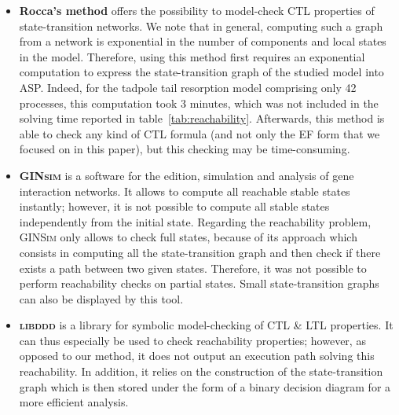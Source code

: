 
 

\begin{itemize}

\item \textbf{Rocca's method} offers the possibility to model-check CTL properties
of state-transition networks.
We note that in general, computing such a graph from a network is exponential in the number of components and local states in the model.
Therefore, using this method first requires an exponential computation to
express the state-transition graph of the studied model into ASP.
Indeed, for the tadpole tail resorption model comprising only 42 processes,
this computation took 3 minutes, which was not included in the solving time
reported in table~\ref{tab:reachability}.
Afterwards, this method is able to check any kind of CTL formula
(and not only the EF form that we focused on in this paper),
but this checking may be time-consuming.

\item \textbf{\textsc{GINsim}} is a software for the edition, simulation and analysis
of gene interaction networks.
It allows to compute all reachable stable states instantly;
however, it is not possible to compute all stable states independently from the initial state.
Regarding the reachability problem, \textsc{GINSim} only allows to check
full states, because of its approach which consists in computing
all the state-transition graph
 
and then check if there exists a path between two given states.
Therefore, it was not possible to perform reachability checks on partial states.
Small state-transition graphs can also be displayed by this tool.

\item \textbf{\textsc{libddd}}
is a library for symbolic model-checking of CTL \& LTL properties.
It can thus especially be used to check reachability properties;
however, as opposed to our method, it does not output an execution path
solving this reachability.
In addition, it relies on the construction of the state-transition graph
which is then stored under the form of a binary decision diagram for a more efficient analysis.


\end{itemize}
